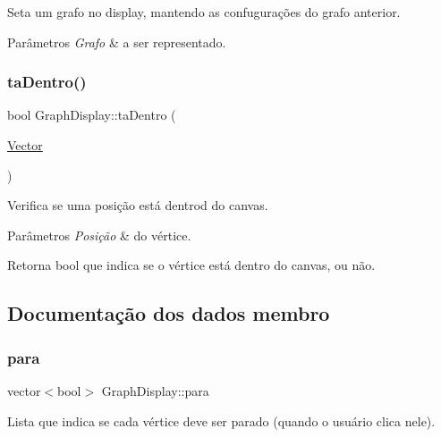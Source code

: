 Seta um grafo no display, mantendo as confugurações do grafo anterior. 
\begin{DoxyParams}{Parâmetros}
{\em Grafo} & a ser representado. \\
\hline
\end{DoxyParams}
\mbox{\label{classGraphDisplay_a6d822244f05f8a0dd1e40a40d13294bf}} 
\subsubsection{\texorpdfstring{ta\+Dentro()}{taDentro()}}
{\footnotesize\ttfamily bool Graph\+Display\+::ta\+Dentro (\begin{DoxyParamCaption}\item[{\hyperlink{classVector}{Vector}}]{ }\end{DoxyParamCaption})}

Verifica se uma posição está dentrod do canvas. 
\begin{DoxyParams}{Parâmetros}
{\em Posição} & do vértice. \\
\hline
\end{DoxyParams}
\begin{DoxyReturn}{Retorna}
bool que indica se o vértice está dentro do canvas, ou não. 
\end{DoxyReturn}


\subsection{Documentação dos dados membro}
\mbox{\label{classGraphDisplay_aa9c12d024cc689f6be699e2028e60d83}} 
\subsubsection{\texorpdfstring{para}{para}}
{\footnotesize\ttfamily vector$<$bool$>$ Graph\+Display\+::para}

Lista que indica se cada vértice deve ser parado (quando o usuário clica nele). \mbox{\label{classGraphDisplay_a5e623e031f43e01713d991c29848cd96}} 
